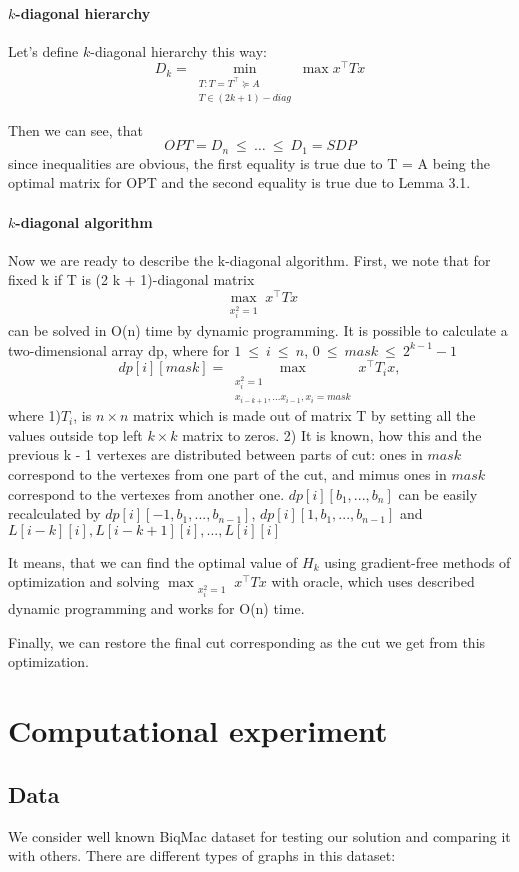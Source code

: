 \documentclass{article}
\newcommand{\x}{\mathbf{x}}
\renewcommand{\le}{\ \leqslant\ }
\begin{document}
\paragraph{$k$-diagonal hierarchy}

Let's define $k$-diagonal hierarchy this way:
\[D_k = \min_{\substack{T: T = T^\top \succeq A\\ T\in(2 k + 1)-diag}} \max x^\top T x\]

Then we can see, that
\[OPT = D_n \le \dots \le D_1 = SDP \]
since inequalities are obvious, the first equality is true due to T = A being the optimal matrix for OPT and the second equality is true due to Lemma 3.1. 

\paragraph{$k$-diagonal algorithm}

Now we are ready to describe the k-diagonal algorithm. 
First, we note that for fixed k if T is (2 k + 1)-diagonal matrix $$\max_{\substack{x_i^2 = 1}} x^\top T x$$ can be solved in O(n) time by dynamic programming. It is possible to calculate a two-dimensional array dp, where for $1 \le i \le n$, $0 \le mask \le 2^{k-1} - 1$ $$dp[i][mask] =  \max_{\substack{x_i^2 = 1\\x_{i - k + 1},...x_{i-1},x_i=mask}} x^\top T_i x,$$ where 1)$T_i$, is $n \times n$ matrix which is made out of matrix T by setting all the values outside top left $k \times k$ matrix to zeros. 2) It is known, how this and the previous k - 1 vertexes are distributed between parts of cut: ones in $mask$ correspond to the vertexes from one part of the cut, and mimus ones in $mask$ correspond to the vertexes from another one. 
$dp[i][b_1, ..., b_n]$ can be easily recalculated by $dp[i][-1, b_1, ..., b_{n - 1}]$, $dp[i][1, b_1, ..., b_{n - 1}]$ and $L[i - k][i], L[i-k + 1][i], ..., L[i][i]$

It means, that we can find the optimal value of $H_k$ using gradient-free methods of optimization and solving $\max_{\substack{x_i^2 = 1}} x^\top T x$ with oracle, which uses described dynamic programming and works for O(n) time.

Finally, we can restore the final cut corresponding as the cut we get from this optimization.
\section{Computational experiment}
\subsection{Data}
We consider well known BiqMac dataset for testing our solution and comparing it with others.
There are different types of graphs in this dataset:
\end{document}
